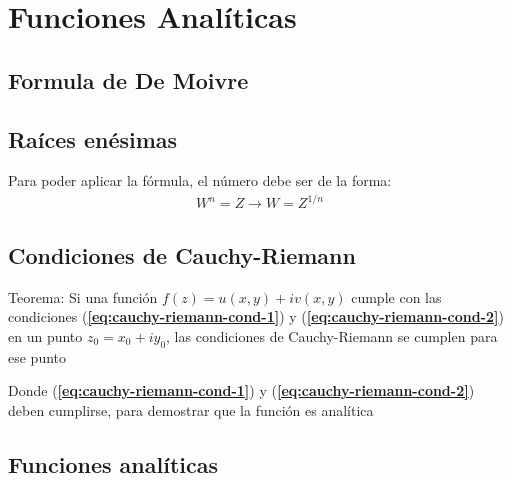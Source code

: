 \section{Funciones Analíticas}

\subsection{Formula de De Moivre}


\subsection{Raíces enésimas}


Para poder aplicar la fórmula, el número debe ser de la forma:
\begin{align}
    W^n = Z \longrightarrow W = Z^{1/n} \nonumber
\end{align}

\subsection{Condiciones de Cauchy-Riemann}
Teorema: Si una función \( f(z) = u(x, y) + iv(x,y) \) cumple con las condiciones (\textbf{\ref{eq:cauchy-riemann-cond-1}}) y (\textbf{\ref{eq:cauchy-riemann-cond-2}}) en un punto \( z_0 = x_0 + iy_0 \), las condiciones de Cauchy-Riemann se cumplen para ese punto



Donde (\textbf{\ref{eq:cauchy-riemann-cond-1}}) y (\textbf{\ref{eq:cauchy-riemann-cond-2}}) deben cumplirse, para demostrar que la función es analítica

\subsection{Funciones analíticas}

